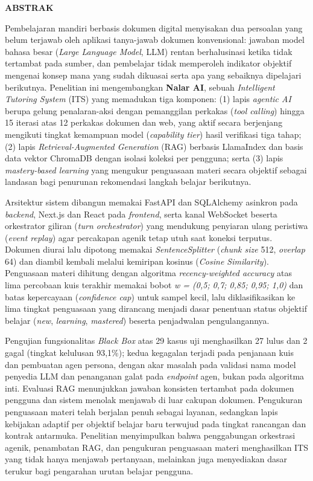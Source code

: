 \documentclass[12pt,a4paper]{article}
\begin{document}
\textbf{ABSTRAK}

Pembelajaran mandiri berbasis dokumen digital menyisakan dua persoalan yang belum terjawab oleh aplikasi tanya-jawab dokumen konvensional: jawaban model bahasa besar (\textit{Large Language Model}, LLM) rentan berhalusinasi ketika tidak tertambat pada sumber, dan pembelajar tidak memperoleh indikator objektif mengenai konsep mana yang sudah dikuasai serta apa yang sebaiknya dipelajari berikutnya. Penelitian ini mengembangkan \textbf{Nalar AI}, sebuah \textit{Intelligent Tutoring System} (ITS) yang memadukan tiga komponen: (1) lapis \textit{agentic AI} berupa gelung penalaran-aksi dengan pemanggilan perkakas (\textit{tool calling}) hingga 15 iterasi atas 12 perkakas dokumen dan web, yang aktif secara berjenjang mengikuti tingkat kemampuan model (\textit{capability tier}) hasil verifikasi tiga tahap; (2) lapis \textit{Retrieval-Augmented Generation} (RAG) berbasis LlamaIndex dan basis data vektor ChromaDB dengan isolasi koleksi per pengguna; serta (3) lapis \textit{mastery-based learning} yang mengukur penguasaan materi secara objektif sebagai landasan bagi penurunan rekomendasi langkah belajar berikutnya.

Arsitektur sistem dibangun memakai FastAPI dan SQLAlchemy asinkron pada \textit{backend}, Next.js dan React pada \textit{frontend}, serta kanal WebSocket beserta orkestrator giliran (\textit{turn orchestrator}) yang mendukung penyiaran ulang peristiwa (\textit{event replay}) agar percakapan agenik tetap utuh saat koneksi terputus. Dokumen diurai lalu dipotong memakai \textit{SentenceSplitter} (\textit{chunk size} 512, \textit{overlap} 64) dan diambil kembali melalui kemiripan kosinus (\textit{Cosine Similarity}). Penguasaan materi dihitung dengan algoritma \textit{recency-weighted accuracy} atas lima percobaan kuis terakhir memakai bobot \textit{w = (0,5; 0,7; 0,85; 0,95; 1,0)} dan batas kepercayaan (\textit{confidence cap}) untuk sampel kecil, lalu diklasifikasikan ke lima tingkat penguasaan yang dirancang menjadi dasar penentuan status objektif belajar (\textit{new}, \textit{learning}, \textit{mastered}) beserta penjadwalan pengulangannya.

Pengujian fungsionalitas \textit{Black Box} atas 29 kasus uji menghasilkan 27 lulus dan 2 gagal (tingkat kelulusan 93,1\%); kedua kegagalan terjadi pada penjanaan kuis dan pembuatan agen persona, dengan akar masalah pada validasi nama model penyedia LLM dan penanganan galat pada \textit{endpoint} agen, bukan pada algoritma inti. Evaluasi RAG menunjukkan jawaban konsisten tertambat pada dokumen pengguna dan sistem menolak menjawab di luar cakupan dokumen. Pengukuran penguasaan materi telah berjalan penuh sebagai layanan, sedangkan lapis kebijakan adaptif per objektif belajar baru terwujud pada tingkat rancangan dan kontrak antarmuka. Penelitian menyimpulkan bahwa penggabungan orkestrasi agenik, penambatan RAG, dan pengukuran penguasaan materi menghasilkan ITS yang tidak hanya menjawab pertanyaan, melainkan juga menyediakan dasar terukur bagi pengarahan urutan belajar pengguna.
\end{document}
